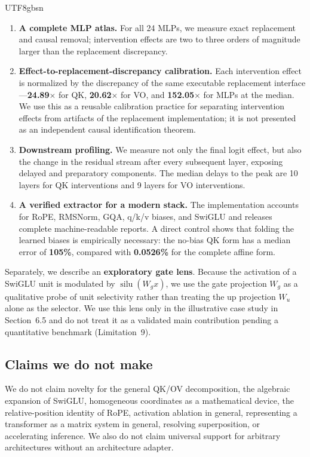 \documentclass[11pt]{article}
\begin{document}
\begin{CJK*}{UTF8}{gbsn}
\begin{enumerate}
\item
  \textbf{A complete MLP atlas.} For all 24 MLPs, we measure exact
  replacement and causal removal; intervention effects are two to three
  orders of magnitude larger than the replacement discrepancy.
\item
  \textbf{Effect-to-replacement-discrepancy calibration.} Each
  intervention effect is normalized by the discrepancy of the same
  executable replacement interface---\textbf{24.89$\times$} for QK,
  \textbf{20.62$\times$} for VO, and \textbf{152.05$\times$} for MLPs at
  the median. We use this as a reusable calibration practice for
  separating intervention effects from artifacts of the replacement
  implementation; it is not presented as an independent causal
  identification theorem.
\item
  \textbf{Downstream profiling.} We measure not only the final logit
  effect, but also the change in the residual stream after every
  subsequent layer, exposing delayed and preparatory components. The
  median delays to the peak are 10 layers for QK interventions and 9
  layers for VO interventions.
\item
  \textbf{A verified extractor for a modern stack.} The implementation
  accounts for RoPE, RMSNorm, GQA, q/k/v biases, and SwiGLU and releases
  complete machine-readable reports. A direct control shows that folding
  the learned biases is empirically necessary: the no-bias QK form has a
  median error of \textbf{105\%}, compared with \textbf{0.0526\%} for the
  complete affine form.
\end{enumerate}

Separately, we describe an \textbf{exploratory gate lens}. Because the
activation of a SwiGLU unit is modulated by
$\operatorname{silu}(W_g x)$, we use the gate projection $W_g$ as a
qualitative probe of unit selectivity rather than treating the up
projection $W_u$ alone as the selector. We use this lens only in the
illustrative case study in Section~6.5 and do not treat it as a validated
main contribution pending a quantitative benchmark (Limitation~9).

\subsection{Claims we do not make}

We do not claim novelty for the general QK/OV decomposition, the
algebraic expansion of SwiGLU, homogeneous coordinates as a mathematical
device, the relative-position identity of RoPE, activation ablation in
general, representing a transformer as a matrix system in general,
resolving superposition, or accelerating inference. We also do not claim
universal support for arbitrary architectures without an architecture
adapter.


\end{CJK*}
\end{document}
